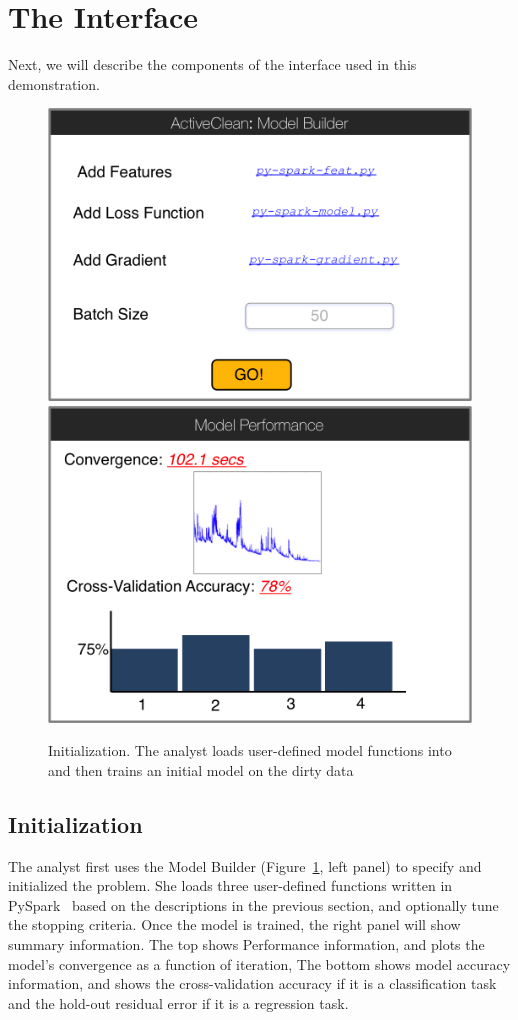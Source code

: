 \section{The Interface}
Next, we will describe the components of the \sys interface used in this demonstration. 

\begin{figure}[t]
\centering
 \includegraphics[width=0.48\columnwidth]{figs/interface1.png}
 \includegraphics[width=0.48\columnwidth]{figs/interface2.png}
 \caption{Initialization. The analyst loads user-defined model functions into \sys and then trains an initial model on the dirty data \label{irun}}
\end{figure}

\subsection{Initialization}
The analyst first uses the \textsf{Model Builder} (Figure~\ref{irun}, left panel) to specify and initialized the problem.
She loads three user-defined functions written in PySpark~\cite{pyspark} based on the descriptions in the previous section, and
optionally  tune the stopping criteria.
Once the model is trained, the right panel will show summary information.
The top shows \textsf{Performance} information, and plots the model's convergence as a function of iteration,
The bottom shows model accuracy information, and shows the cross-validation accuracy if it is a classification task and the hold-out residual error if it is a regression task.

